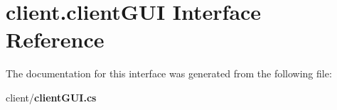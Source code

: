 \section{client.\-client\-G\-U\-I Interface Reference}
\label{interfaceclient_1_1client_g_u_i}


The documentation for this interface was generated from the following file\-:\begin{DoxyCompactItemize}
\item 
client/{\bf client\-G\-U\-I.\-cs}\end{DoxyCompactItemize}
